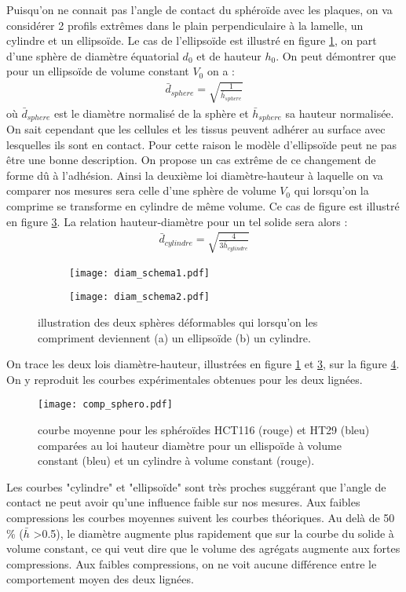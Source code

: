   Puisqu'on ne connait pas l'angle de contact du sphéroïde avec les plaques, on va considérer 2 profils extrêmes dans le plain perpendiculaire à la lamelle, un cylindre et un ellipsoïde. Le cas de l'ellipsoïde est illustré en figure \ref{sphère}, on part d'une sphère de diamètre équatorial $d_0$ et de hauteur $h_0$. On peut démontrer que pour un ellipsoïde de volume constant $V_0$ on a : 
\begin{align}
\bar{d}_{sphere}  = \sqrt{\frac{1}{\bar{h}_{sphere}}}\label{eq:sphere}
\end{align}
où $\bar{d}_{sphere}$ est le diamètre normalisé de la  sphère et $\bar{h}_{sphere}$ sa hauteur normalisée. On sait cependant que les cellules et les tissus peuvent adhérer au surface avec lesquelles ils sont en contact. Pour cette raison le modèle d'ellipsoïde peut ne pas être une bonne description. On propose un cas extrême de ce changement de forme dû à l'adhésion. Ainsi la deuxième loi diamètre-hauteur à laquelle on va comparer nos mesures sera celle d'une sphère de volume $V_0$ qui lorsqu'on la comprime se transforme en cylindre de même volume. Ce cas de figure est illustré en figure \ref{cylindre}.  La relation hauteur-diamètre pour un tel solide sera alors :
\begin{align}
 \bar{d}_{cylindre}  = \sqrt{\frac{4}{3\bar{h}_{cylindre}}}\label{eq:cylindre}
 \end{align}
\begin{figure}[ht!]
\begin{subfigure}[t]{0.49\textwidth}
	\texttt{[image: diam\_schema1.pdf]}
	\caption{ \label{sphère}}
\end{subfigure}
\begin{subfigure}[t]{0.49\textwidth}
	\texttt{[image: diam\_schema2.pdf]}
	\caption{\label{cylindre}}
\end{subfigure}
\caption{illustration des deux sphères déformables qui lorsqu'on les compriment deviennent (a) un ellipsoïde (b) un cylindre. }
\end{figure}
On trace les deux lois diamètre-hauteur, illustrées en figure \ref{sphère} et \ref{cylindre}, sur la figure \ref{comp_sphero}. On y reproduit les courbes expérimentales obtenues pour les deux lignées.

\begin{figure}[ht!]
\centering
	\texttt{[image: comp\_sphero.pdf]}
	\caption{courbe moyenne pour les sphéroïdes HCT116 (rouge) et  HT29 (bleu)  comparées au loi hauteur diamètre pour un ellispoïde à volume constant (bleu) et un cylindre à volume constant (rouge). \label{comp_sphero}}
\end{figure}
Les courbes "cylindre" et "ellipsoïde" sont très proches suggérant que l'angle de contact ne peut avoir qu'une influence faible sur nos mesures.  Aux faibles compressions  les courbes moyennes suivent les courbes théoriques. Au delà de 50 \% ($\bar{h}$ >0.5), le diamètre augmente plus rapidement que sur la courbe du solide à volume constant, ce qui veut dire que le volume des agrégats augmente aux fortes compressions. Aux faibles compressions, on ne voit aucune différence entre le comportement moyen des deux lignées.

